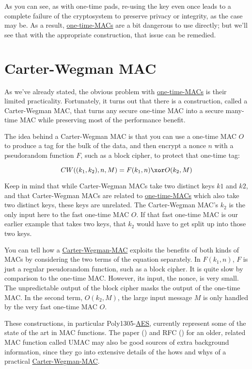 \documentclass[11pt,ebook,table,dvipsnames]{memoir}
\begin{document}
As you can see, as with one-time pads, re-using the key even once
leads to a complete failure of the cryptosystem to preserve privacy or
integrity, as the case may be. As a result, \hyperref[One-time MACs]{one-time-MACs} are a bit
dangerous to use directly; but we'll see that with the appropriate
construction, that issue can be remedied.
\section{\label{Carter-Wegman-MAC}Carter-Wegman MAC}
\label{sec-2-7-6}

As we've already stated, the obvious problem with \hyperref[One-time MACs]{one-time-MACs} is
their limited practicality. Fortunately, it turns out that there is a
construction, called a \gls{Carter-Wegman MAC}, that turns any secure
one-time MAC into a secure many-time MAC while preserving most of the
performance benefit.

The idea behind a \gls{Carter-Wegman MAC} is that you can use a
one-time MAC $O$ to produce a tag for the bulk of the data, and then
encrypt a nonce $n$ with a pseudorandom function $F$, such as a block
cipher, to protect that one-time tag:

\[
CW((k_1, k_2), n, M) = F(k_1, n) \xor O(k_2, M)
\]

Keep in mind that while Carter-Wegman MACs take two distinct keys $k1$
and $k2$, and that Carter-Wegman MACs are related to \hyperref[One-time MACs]{one-time-MACs}
which also take two distinct keys, these keys are unrelated. The
Carter-Wegman MAC's $k_2$ is the only input here to the fast one-time
MAC $O$. If that fast one-time MAC is our earlier example that takes
two keys, that $k_2$ would have to get split up into those two keys.

You can tell how a \hyperref[Carter-Wegman MAC]{Carter-Wegman-MAC} exploits the benefits of both
kinds of MACs by considering the two terms of the equation separately.
In $F(k_1, n)$, $F$ is just a regular pseudorandom function, such as a
block cipher. It is quite slow by comparison to the one-time MAC.
However, its input, the nonce, is very small. The unpredictable output
of the block cipher masks the output of the one-time MAC. In the
second term, $O(k_2, M)$, the large input message $M$ is only handled
by the very fast one-time MAC $O$.

These constructions, in particular Poly1305-\hyperref[AES]{AES}, currently represent
some of the state of the art in MAC functions. The paper (\cite{umac})
and RFC (\cite{rfc4418}) for an older, related MAC function called
UMAC may also be good sources of extra background information, since
they go into extensive details of the hows and whys of a practical
\hyperref[Carter-Wegman MAC]{Carter-Wegman-MAC}.
\end{document}
